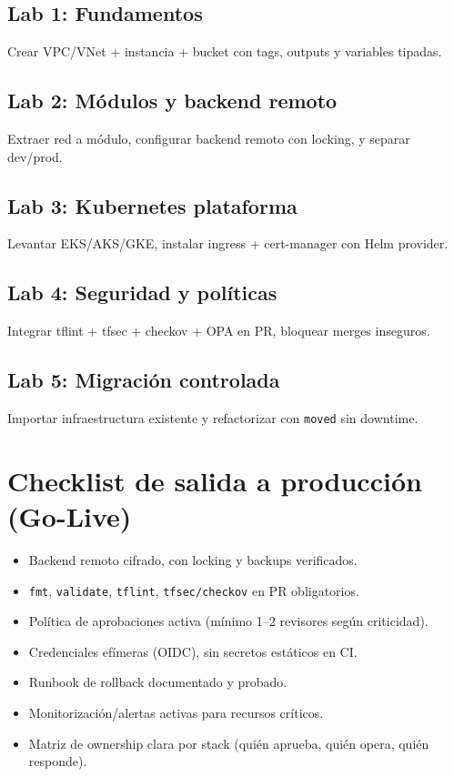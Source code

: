 \documentclass[12pt,a4paper]{article}
\begin{document}
\subsection*{Lab 1: Fundamentos}
Crear VPC/VNet + instancia + bucket con tags, outputs y variables tipadas.

\subsection*{Lab 2: Módulos y backend remoto}
Extraer red a módulo, configurar backend remoto con locking, y separar dev/prod.

\subsection*{Lab 3: Kubernetes plataforma}
Levantar EKS/AKS/GKE, instalar ingress + cert-manager con Helm provider.

\subsection*{Lab 4: Seguridad y políticas}
Integrar tflint + tfsec + checkov + OPA en PR, bloquear merges inseguros.

\subsection*{Lab 5: Migración controlada}
Importar infraestructura existente y refactorizar con \texttt{moved} sin downtime.

\section{Checklist de salida a producción (Go-Live)}

\begin{tfchecklist}
\begin{itemize}
	\item Backend remoto cifrado, con locking y backups verificados.
	\item \texttt{fmt}, \texttt{validate}, \texttt{tflint}, \texttt{tfsec/checkov} en PR obligatorios.
	\item Política de aprobaciones activa (mínimo 1--2 revisores según criticidad).
	\item Credenciales efímeras (OIDC), sin secretos estáticos en CI.
	\item Runbook de rollback documentado y probado.
	\item Monitorización/alertas activas para recursos críticos.
	\item Matriz de ownership clara por stack (quién aprueba, quién opera, quién responde).
\end{itemize}
\end{tfchecklist}
\end{document}
